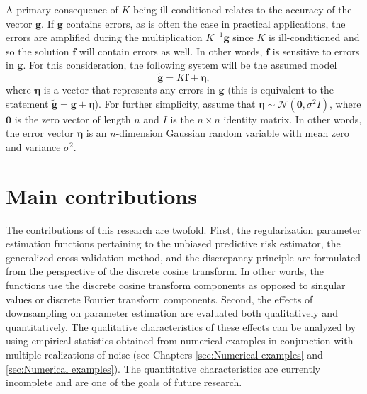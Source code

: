 \documentclass[12pt]{book}
\newcommand{\gVec}{\mathbf{g}}	%
\newcommand{\gnoiseVec}{\widetilde{\mathbf{g}}}	%
\newcommand{\kMat}{K}	%
\newcommand{\fVec}{\mathbf{f}}	%
\newcommand{\noise}{\eta}	%
\newcommand{\noiseSD}{\sigma}	%
\newcommand{\noiseVec}{\bm{\noise}}	%
\begin{document}
A primary consequence of $\kMat$ being ill-conditioned relates to the accuracy of the vector $\gVec$. If $\gVec$ contains errors, as is often the case in practical applications, the errors are amplified during the multiplication $\kMat^{-1}\gVec$ since $\kMat$ is ill-conditioned and so the solution $\fVec$ will contain errors as well. In other words, $\fVec$ is sensitive to errors in $\gVec$. For this consideration, the following system will be the assumed model
\begin{equation}
\gnoiseVec = \kMat\fVec + \noiseVec,
\label{eq:DisNoise}
\end{equation}
where $\noiseVec$ is a vector that represents any errors in $\gVec$ (this is equivalent to the statement $\gnoiseVec = \gVec + \noiseVec$). For further simplicity, assume that $\noiseVec \sim \mathcal{N}(\bm{0},\noiseSD^2I)$, where $\bm{0}$ is the zero vector of length $n$ and $I$ is the $n \times n$ identity matrix. In other words, the error vector $\noiseVec$ is an $n$-dimension Gaussian random variable with mean zero and variance $\noiseSD^2$. 

\section{Main contributions}
The contributions of this research are twofold. First, the regularization parameter estimation functions pertaining to the unbiased predictive risk estimator, the generalized cross validation method, and the discrepancy principle are formulated from the perspective of the discrete cosine transform. In other words, the functions use the discrete cosine transform components as opposed to singular values or discrete Fourier transform components. Second, the effects of downsampling on parameter estimation are evaluated both qualitatively and quantitatively. The qualitative characteristics of these effects can be analyzed by using empirical statistics obtained from numerical examples in conjunction with multiple realizations of noise (see Chapters \ref{sec:Numerical examples} and \ref{sec:Numerical examples}). The quantitative characteristics are currently incomplete and are one of the goals of future research.
\end{document}
